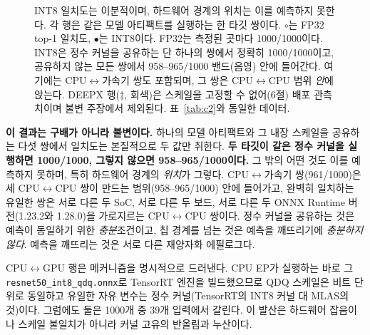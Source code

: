 \documentclass[11pt]{article}
\begin{document}
\begin{figure}[htbp]
\caption{INT8 일치도는 이분적이며, 하드웨어 경계의 위치는 이를 예측하지 못한다. 각 행은 같은 모델 아티팩트를 실행하는 한 타깃 쌍이다. $\circ$는 FP32 top-1 일치도, $\bullet$는 INT8이다. FP32는 측정된 곳마다 1000/1000이다. INT8은 정수 커널을 공유하는 단 하나의 쌍에서 정확히 1000/1000이고, 공유하지 않는 모든 쌍에서 958--965/1000 밴드(음영) 안에 들어간다. 여기에는 CPU$\leftrightarrow$가속기 쌍도 포함되며, 그 쌍은 CPU$\leftrightarrow$CPU 범위 \emph{안}에 앉는다. DEEPX 행($\ddagger$, 회색)은 스케일을 고정할 수 없어(6절) 배포 관측치이며 불변 주장에서 제외된다. 표~\ref{tab:c2}와 동일한 데이터.}
\label{fig:c2}
\end{figure}

\textbf{이 결과는 구배가 아니라 불변이다.} 하나의 모델 아티팩트와 그 내장 스케일을 공유하는 다섯 쌍에서 일치도는 본질적으로 두 값만 취한다. \textbf{두 타깃이 같은 정수 커널을 실행하면 1000/1000, 그렇지 않으면 958--965/1000이다.} 그 밖의 어떤 것도 이를 예측하지 못하며, 특히 하드웨어 경계의 \emph{위치}가 그렇다. CPU$\leftrightarrow$가속기 쌍(961/1000)은 세 CPU$\leftrightarrow$CPU 쌍이 만드는 범위(958--965/1000) 안에 들어가고, 완벽히 일치하는 유일한 쌍은 서로 다른 두 SoC, 서로 다른 두 보드, 서로 다른 두 ONNX Runtime 버전(1.23.2와 1.28.0)을 가로지르는 CPU$\leftrightarrow$CPU 쌍이다. 정수 커널을 공유하는 것은 예측이 동일하기 위한 \emph{충분}조건이고, 칩 경계를 넘는 것은 예측을 깨뜨리기에 \emph{충분하지 않다}. 예측을 깨뜨리는 것은 서로 다른 재양자화 에필로그다.

CPU$\leftrightarrow$GPU 행은 메커니즘을 명시적으로 드러낸다. CPU EP가 실행하는 바로 그 \texttt{resnet50\_int8\_qdq.onnx}로 TensorRT 엔진을 빌드했으므로 QDQ 스케일은 비트 단위로 동일하고 유일한 자유 변수는 정수 커널(TensorRT의 INT8 커널 대 MLAS의 것)이다. 그럼에도 둘은 1000개 중 39개 입력에서 갈린다. 이 발산은 하드웨어 잡음이나 스케일 불일치가 아니라 커널 고유의 반올림과 누산이다.
\end{document}
